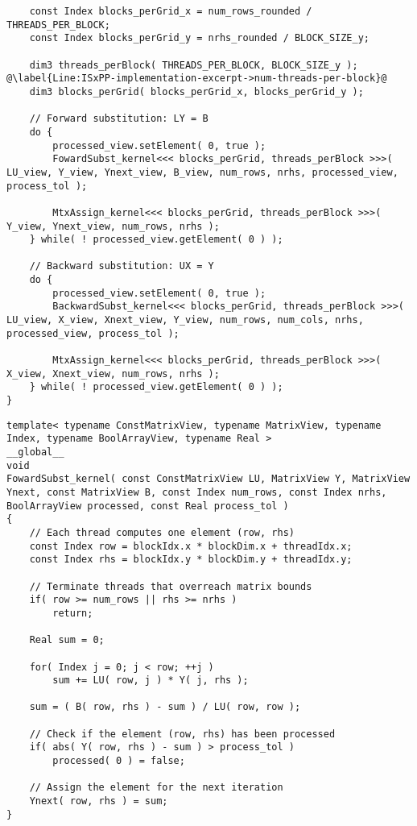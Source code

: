 \begin{lstlisting}
	const Index blocks_perGrid_x = num_rows_rounded / THREADS_PER_BLOCK;
	const Index blocks_perGrid_y = nrhs_rounded / BLOCK_SIZE_y;
	
	dim3 threads_perBlock( THREADS_PER_BLOCK, BLOCK_SIZE_y ); @\label{Line:ISxPP-implementation-excerpt->num-threads-per-block}@
	dim3 blocks_perGrid( blocks_perGrid_x, blocks_perGrid_y );
	
	// Forward substitution: LY = B
	do {
		processed_view.setElement( 0, true );
		FowardSubst_kernel<<< blocks_perGrid, threads_perBlock >>>( LU_view, Y_view, Ynext_view, B_view, num_rows, nrhs, processed_view, process_tol );
		
		MtxAssign_kernel<<< blocks_perGrid, threads_perBlock >>>( Y_view, Ynext_view, num_rows, nrhs );
	} while( ! processed_view.getElement( 0 ) );
	
	// Backward substitution: UX = Y
	do {
		processed_view.setElement( 0, true );
		BackwardSubst_kernel<<< blocks_perGrid, threads_perBlock >>>( LU_view, X_view, Xnext_view, Y_view, num_rows, num_cols, nrhs, processed_view, process_tol );

		MtxAssign_kernel<<< blocks_perGrid, threads_perBlock >>>( X_view, Xnext_view, num_rows, nrhs );
	} while( ! processed_view.getElement( 0 ) );
}
\end{lstlisting}

\begin{lstlisting}[caption={Implementation of the \code{FowardSubst\_kernel()} kernel which computes one forward-substitution iteration.},label={Listing:ISxPP-implementation->kernels->forward-substitution}]
template< typename ConstMatrixView, typename MatrixView, typename Index, typename BoolArrayView, typename Real >
__global__
void
FowardSubst_kernel( const ConstMatrixView LU, MatrixView Y, MatrixView Ynext, const MatrixView B, const Index num_rows, const Index nrhs, BoolArrayView processed, const Real process_tol )
{
	// Each thread computes one element (row, rhs)
	const Index row = blockIdx.x * blockDim.x + threadIdx.x;
	const Index rhs = blockIdx.y * blockDim.y + threadIdx.y;
	
	// Terminate threads that overreach matrix bounds
	if( row >= num_rows || rhs >= nrhs )
		return;
	
	Real sum = 0;
	
	for( Index j = 0; j < row; ++j )
		sum += LU( row, j ) * Y( j, rhs );
	
	sum = ( B( row, rhs ) - sum ) / LU( row, row );
	
	// Check if the element (row, rhs) has been processed
	if( abs( Y( row, rhs ) - sum ) > process_tol )
		processed( 0 ) = false;
	
	// Assign the element for the next iteration
	Ynext( row, rhs ) = sum;
}
\end{lstlisting}

